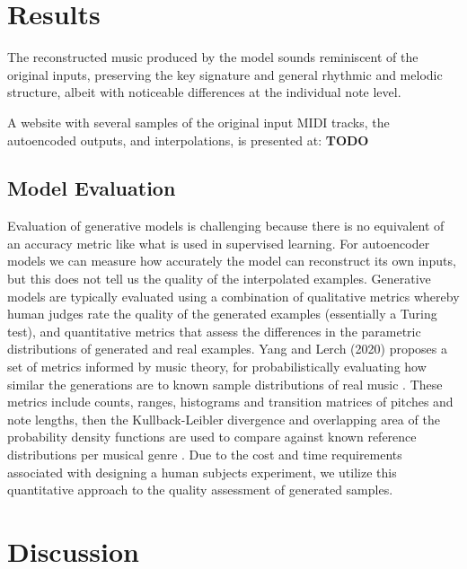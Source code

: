 \documentclass[sigconf,authorversion]{acmart}
\begin{document}
\section{Results}

The reconstructed music produced by the model sounds reminiscent of
the original inputs, preserving the key signature and general rhythmic
and melodic structure, albeit with noticeable differences at the
individual note level.

A website with several samples of the original input MIDI tracks, the
autoencoded outputs, and interpolations, is presented at: \textbf{TODO}

\subsection{Model Evaluation}

Evaluation of generative models is challenging because there is no
equivalent of an accuracy metric like what is used in supervised
learning. For autoencoder models we can measure how accurately the
model can reconstruct its own inputs, but this does not tell us the
quality of the interpolated examples. Generative models are typically
evaluated using a combination of qualitative metrics whereby human
judges rate the quality of the generated examples (essentially a
Turing test), and quantitative metrics that assess the differences in
the parametric distributions of generated and real examples. Yang and
Lerch (2020) proposes a set of metrics informed by music theory, for
probabilistically evaluating how similar the generations are to known
sample distributions of real music \cite{yang_evaluation_2020}. These
metrics include counts, ranges, histograms and transition matrices of
pitches and note lengths, then the Kullback-Leibler divergence and
overlapping area of the probability density functions are used to
compare against known reference distributions per musical genre
\cite{yang_evaluation_2020}. Due to the cost and time requirements
associated with designing a human subjects experiment, we
utilize this quantitative approach to the quality assessment of
generated samples.

\section{Discussion}



\end{document}
